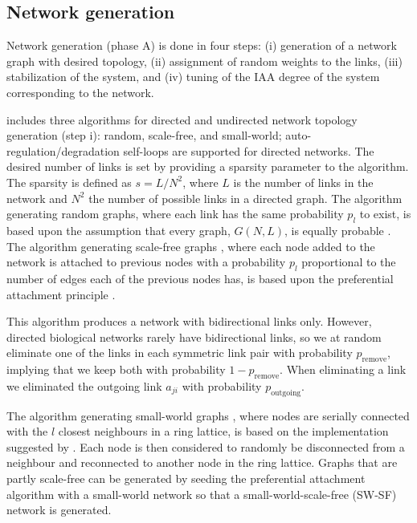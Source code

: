 \subsection{Network generation}
\label{sec:network_generation}

Network generation (phase A) is done in four steps: (i) generation of a network graph with desired topology, (ii) assignment of random weights to the links, (iii) stabilization of the system, and (iv) tuning of the IAA degree of the system corresponding to the network.

\gs includes three algorithms for directed and undirected network topology generation (step i): random, scale-free, and small-world; auto-regulation/degradation self-loops are supported for directed networks.
The desired number of links is set by providing a sparsity parameter to the algorithm. The sparsity is defined as \(s=L/N^2\), where \(L\) is the number of links in the network and \(N^2\) the number of possible links in a directed graph.
The algorithm generating random graphs, where each link has the same probability \(p_l\) to exist, is based upon the assumption that every graph, \(G(N,L)\), is equally probable \citep{Erdos1961}.
The algorithm generating scale-free graphs \citep{Barabasi1999}, where each node added to the network is attached to previous nodes with a probability \(p_l\) proportional to the number of edges each of the previous nodes has, is based upon the preferential attachment principle \citep{Reka-Barabasi2002}.

This algorithm produces a network with bidirectional links only. 
However, directed biological networks rarely have bidirectional links, so we at random eliminate one of the links in each symmetric link pair with probability \(p_{\text{remove}}\), implying that we keep both with probability \(1-p_{\text{remove}}\). When eliminating a link we eliminated the outgoing link $a_{ji}$ with probability \(p_{\text{outgoing}}\).

The algorithm generating small-world graphs \citep{Watts1998}, where nodes are serially connected with the \(l\) closest neighbours in a ring lattice, is based on the implementation suggested by \citet{Prettejohn2011}. Each node is then considered to randomly be disconnected from a neighbour and reconnected to another node in the ring lattice.
Graphs that are partly scale-free can be generated by seeding the preferential attachment algorithm with \eg a small-world network so that a small-world-scale-free (SW-SF) network is generated.

